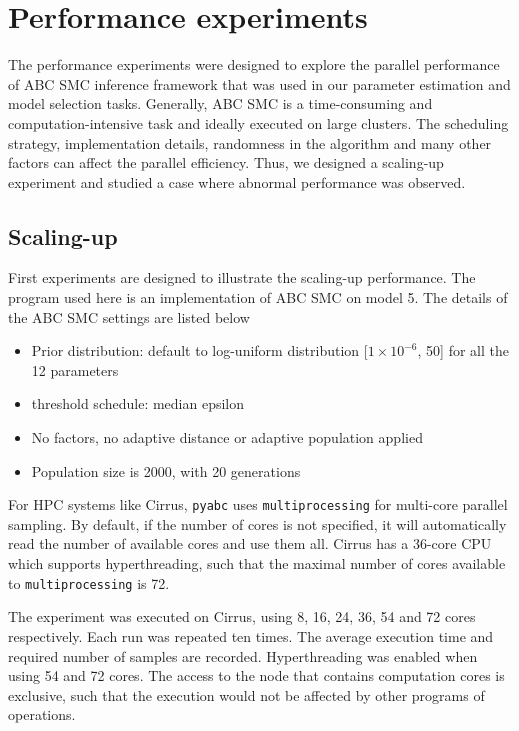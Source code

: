 \chapter{Performance experiments}

The performance experiments were designed to explore the parallel performance of ABC SMC inference framework that was used in our parameter estimation and model selection tasks. Generally, ABC SMC is a time-consuming and computation-intensive task and ideally executed on large clusters. The scheduling strategy, implementation details, randomness in the algorithm and many other factors can affect the parallel efficiency. Thus, we designed a scaling-up experiment and studied a case where abnormal performance was observed.


\section{Scaling-up}

First experiments are designed to illustrate the scaling-up performance. The program used here is an implementation of ABC SMC on model 5. The details of the ABC SMC settings are listed below

\begin{itemize}
    \item Prior distribution: default to log-uniform distribution [$1\times 10^{-6}$, 50] for all the 12 parameters
    \item threshold schedule: median epsilon
    \item No factors, no adaptive distance or adaptive population applied
    \item Population size is 2000, with 20 generations
\end{itemize}


For HPC systems like Cirrus, \verb|pyabc| uses \verb|multiprocessing| for multi-core parallel sampling. By default, if the number of cores is not specified, it will automatically read the number of available cores and use them all. Cirrus has a 36-core CPU which supports hyperthreading, such that the maximal number of cores available to \verb|multiprocessing| is 72.

The experiment was executed on Cirrus, using 8, 16, 24, 36, 54 and 72 cores respectively. Each run was repeated ten times. The average execution time and required number of samples are recorded. Hyperthreading was enabled when using 54 and 72 cores. The access to the node that contains computation cores is exclusive, such that the execution would not be affected by other programs of operations.

